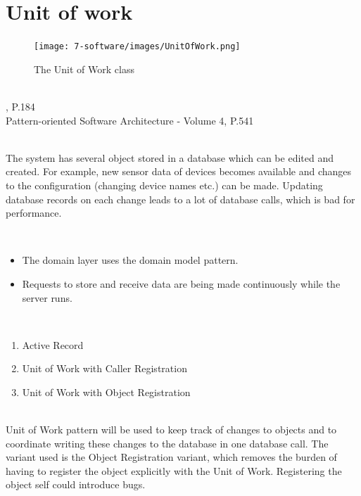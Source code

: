 \section{Unit of work}

\begin{description}
\begin{figure}[H]
\centering
\texttt{[image: 7-software/images/UnitOfWork.png]}
\caption{The Unit of Work class}
\label{fig:unitofworkclass}
\end{figure}
\item [Source]~\\
\EAA , P.184 \cite{eaa}\\
Pattern-oriented Software Architecture - Volume 4, P.541 \cite{wiley-4}

\item [Issue]~\\
The system has several object stored in a database which can be edited and created. For example, new sensor data of devices becomes available and changes to the configuration (changing device names etc.) can be made. Updating database records on each change leads to a lot of database calls, which is bad for performance.

\item [Assumptions/Constraints]~\\
\begin{itemize}
\item The domain layer uses the domain model pattern.
\item Requests to store and receive data are    being made continuously while the server runs.

\end{itemize}

\item [Positions]~
\begin{enumerate}
\item Active Record
\item Unit of Work with Caller Registration
\item Unit of Work with Object Registration
\end{enumerate}

\item [Decision] ~\\
Unit of Work pattern will be used to keep track of changes to objects and to coordinate writing these changes to the database in one database call.
The variant used is the Object Registration variant, which removes the burden of having to register the object explicitly with the Unit of Work. Registering the object self could introduce bugs.


\end{description}
